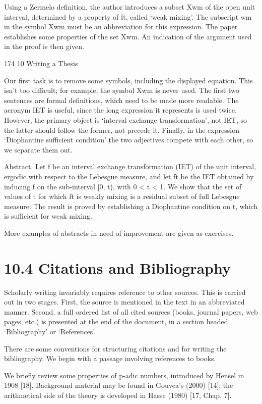 \documentclass[11pt]{article}
\theoremstyle{plain}
\theoremstyle{definition}
\begin{document}
Using a Zermelo definition, the author introduces a subset Xwm of the open unit interval, determined by a property of ft, called `weak mixing'. The subscript wm in the symbol Xwm must be an abbreviation for this expression. The paper establishes some properties of the set Xwm. An indication of the argument used in the proof is then given.

174 10 Writing a Thesis

Our first task is to remove some symbols, including the displayed equation. This isn't too difficult; for example, the symbol Xwm is never used. The first two sentences are formal definitions, which need to be made more readable. The acronym IET is useful, since the long expression it represents is used twice. However, the primary object is `interval exchange transformation', not IET, so the latter should follow the former, not precede it. Finally, in the expression `Diophantine sufficient condition' the two adjectives compete with each other, so we separate them out.

Abstract. Let f be an interval exchange transformation (IET) of the unit interval, ergodic with respect to the Lebesgue measure, and let ft be the IET obtained by inducing f on the sub-interval [0, t), with 0 < t < 1. We show that the set of values of t for which ft is weakly mixing is a residual subset of full Lebesgue measure. The result is proved by establishing a Diophantine condition on t, which is sufficient for weak mixing.

More examples of abstracts in need of improvement are given as exercises.

\section{10.4 Citations and Bibliography}

Scholarly writing invariably requires reference to other sources. This is carried out in two stages. First, the source is mentioned in the text in an abbreviated manner. Second, a full ordered list of all cited sources (books, journal papers, web pages, etc.) is presented at the end of the document, in a section headed `Bibliography' or `References'.

There are some conventions for structuring citations and for writing the bibliography. We begin with a passage involving references to books.

We briefly review some properties of p-adic numbers, introduced by Hensel in 1908 [18]. Background material may be found in Gouvea's (2000) [14]; the arithmetical side of the theory is developed in Hasse (1980) [17, Chap. 7].
\end{document}
